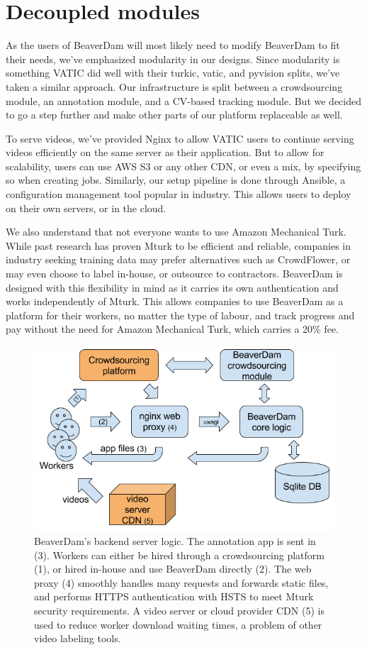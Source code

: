 \section{Decoupled modules}

As the users of BeaverDam will most likely need to modify BeaverDam to fit their needs,
we've emphasized modularity in our designs.
Since modularity is something VATIC did well with their turkic, vatic, and pyvision splits,
we've taken a similar approach.
Our infrastructure is split between a crowdsourcing module, an annotation module, and a CV-based tracking module.
But we decided to go a step further and make other parts of our platform replaceable as well.

To serve videos, we've provided Nginx to allow VATIC users to continue serving videos efficiently on the same server as their application.
But to allow for scalability, users can use AWS S3 or any other CDN, or even a mix, by specifying so when creating jobs.
Similarly, our setup pipeline is done through Ansible, a configuration management tool popular in industry.
This allows users to deploy on their own servers, or in the cloud.

We also understand that not everyone wants to use Amazon Mechanical Turk.
While past research has proven Mturk to be efficient and reliable,
companies in industry seeking training data may prefer alternatives such as CrowdFlower,
or may even choose to label in-house, or outsource to contractors.
BeaverDam is designed with this flexibility in mind as it carries its own authentication and works independently of Mturk.
This allows companies to use BeaverDam as a platform for their workers, no matter the type of labour, 
and track progress and pay without the need for Amazon Mechanical Turk, which carries a 20\% fee.

\begin{figure}[h]
\includegraphics[width=14cm]{figs/backend.png}
\centering
\caption{BeaverDam's backend server logic. The annotation app is sent in (3). Workers can either be hired through a crowdsourcing platform (1), or hired in-house and use BeaverDam directly (2). The web proxy (4) smoothly handles many requests and forwards static files, and performs HTTPS authentication with HSTS to meet Mturk security requirements. A video server or cloud provider CDN (5) is used to reduce worker download waiting times, a problem of other video labeling tools.}
\end{figure}

